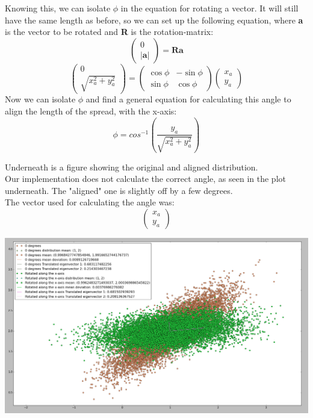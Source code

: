 \documentclass[12pt, a4paper]{article}
\begin{document}
\begin{itemize}
Knowing this, we can isolate $\phi$ in the equation for rotating a vector. It will still have the same length as before, so we can set up the following equation, where \textbf{a} is the vector to be rotated and \textbf{R} is the rotation-matrix:
\begin{equation*}
\left( \begin{array}{c}
0 \\
|\textbf{a}| \end{array} \right)
=
\textbf{R}\textbf{a}
\end{equation*}
\begin{equation*}
\left( \begin{array}{c}
0 \\
\sqrt{x_a^2+y_a^2} 
\end{array} \right)
=
\left( \begin{array}{cc}
\cos \phi & -\sin \phi \\
\sin \phi & \cos \phi \end{array} \right)
\left( \begin{array}{c}
x_a \\
y_a \end{array} \right)
\end{equation*} 
Now we can isolate $\phi$ and find a general equation for calculating this angle to align the length of the spread, with the x-axis:
\begin{equation*}
\phi = cos^{-1}\left(\dfrac{y_a}{\sqrt{x_a^2+y_a^2}}\right)
\end{equation*}

Underneath is a figure showing the original and aligned distribution.\\
Our implementation does not calculate the correct angle, as seen in the plot underneath. The "aligned" one is slightly off by a few degrees.\\
The vector used for calculating the angle was: 
\begin{equation*}
\left( \begin{array}{c}
x_a \\
y_a \end{array} \right)
\end{equation*}

\includegraphics[width=\textwidth]{7.png}

\end{itemize}
\end{document}
